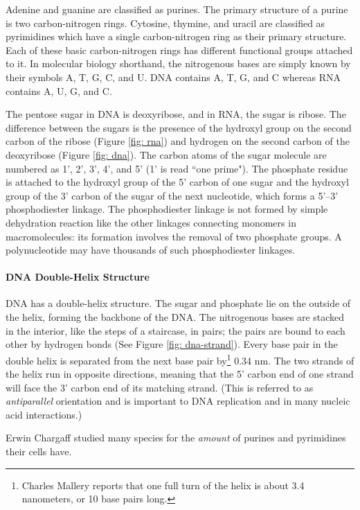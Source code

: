 \documentclass[12pt]{article}
\begin{document}
Adenine and guanine are classified as purines. The primary structure of a purine is two carbon-nitrogen rings. Cytosine, thymine, and uracil are classified as pyrimidines which have a single carbon-nitrogen ring as their primary structure. Each of these basic carbon-nitrogen rings has different functional groups attached to it. In molecular biology shorthand, the nitrogenous bases are simply known by their symbols A, T, G, C, and U. DNA contains A, T, G, and C whereas RNA contains A, U, G, and C.

The pentose sugar in DNA is deoxyribose, and in RNA, the sugar is ribose. The difference between the sugars is the presence of the hydroxyl group on the second carbon of the ribose (Figure \ref{fig: rna}) and hydrogen on the second carbon of the deoxyribose (Figure \ref{fig: dna}). The carbon atoms of the sugar molecule are numbered as 1', 2', 3', 4', and 5' (1' is read ``one prime"). The phosphate residue is attached to the hydroxyl group of the 5' carbon of one sugar and the hydroxyl group of the 3' carbon of the sugar of the next nucleotide, which forms a 5'–3' phosphodiester linkage. The phosphodiester linkage is not formed by simple dehydration reaction like the other linkages connecting monomers in macromolecules: its formation involves the removal of two phosphate groups. A polynucleotide may have thousands of such phosphodiester linkages.

\paragraph{DNA Double-Helix Structure}
DNA has a double-helix structure. The sugar and phosphate lie on the outside of the helix, forming the backbone of the DNA. The nitrogenous bases are stacked in the interior, like the steps of a staircase, in pairs; the pairs are bound to each other by hydrogen bonds (See Figure \ref{fig: dna-strand}). Every base pair in the double helix is separated from the next base pair by\footnote{Charles Mallery \cite{mallery} reports that one full turn of the helix is about 3.4 nanometers, or 10 base pairs long.} 0.34 nm. The two strands of the helix run in opposite directions, meaning that the 5' carbon end of one strand will face the 3' carbon end of its matching strand. (This is referred to as \emph{antiparallel} orientation and is important to DNA replication and in many nucleic acid interactions.)

Erwin Chargaff studied many species for the \emph{amount} of purines and pyrimidines their cells have. 
\end{document}

